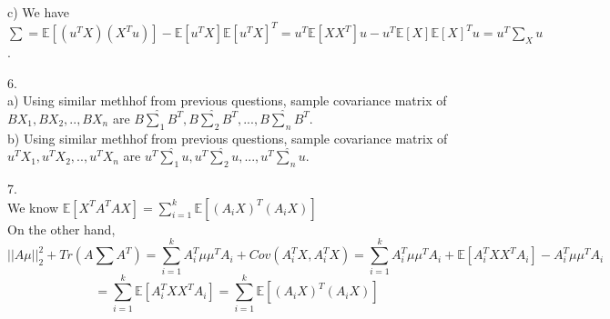 \documentclass[10pt]{article}
\newenvironment{problem}[2][Problem]{\begin{trivlist}
\item[\hskip \labelsep {\bfseries #1}\hskip \labelsep {\bfseries #2.}]}{\end{trivlist}}
\begin{document}
\begin{problem}{3}
c) We have $\sum = \mathbb{E}[(u^{T}X) (X^{T}u)] - \mathbb{E}[u^{T}X]\mathbb{E}[u^{T}X]^{T}= u^{T}\mathbb{E}[XX^{T}]u - u^{T}\mathbb{E}[X]\mathbb{E}[X]^{T}u = u^{T}\sum_{X}u$.
\item 6.\\
a) Using similar methhof from previous questions, sample covariance matrix of $BX_1, BX_2,..,BX_n$ are $B\hat{\sum}_{1}B^{T}, B\hat{\sum}_{2}B^{T},...,B\hat{\sum}_{n}B^{T}$.\\
b) Using similar methhof from previous questions, sample covariance matrix of $u^{T}X_1, u^{T}X_2,..,u^{T}X_n$ are $u^{T}\hat{\sum}_{1}u, u^{T}\hat{\sum}_{2}u,...,u^{T}\hat{\sum}_{n}u$.\\
\item 7. \\
We know $\mathbb{E}[X^{T}A^{T}AX] = \sum_{i=1}^{k}\mathbb{E}[(A_{i}X)^{T}(A_iX)]$\\
On the other hand, 
\[ ||A\mu||_{2}^{2} + Tr(A\sum A^{T}) = \sum_{i=1}^{k}A_{i}^{T}\mu \mu^{T}A_{i} + Cov(A_{i}^{T}X, A_{i}^{T}X) = \sum_{i=1}^{k}A_{i}^{T}\mu \mu^{T}A_{i} + \mathbb{E}[A_{i}^{T}XX^{T}A_{i}] - A_{i}^{T}\mu \mu^{T} A_{i}\]
\[ = \sum_{i=1}^{k}\mathbb{E}[A_{i}^{T}XX^{T}A_{i}] =  \sum_{i=1}^{k}\mathbb{E}[(A_{i}X)^{T}(A_iX)]\]



\end{problem}
\end{document}
